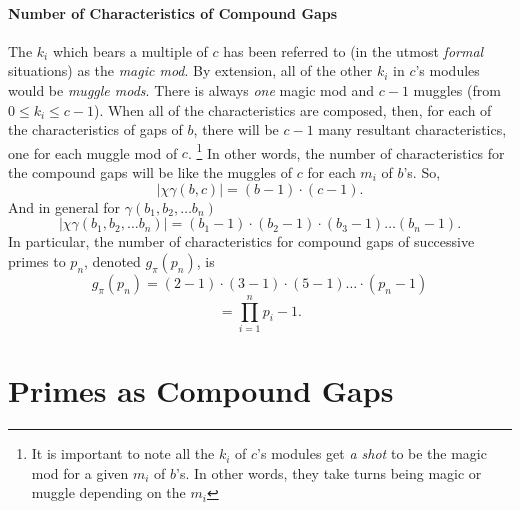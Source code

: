 \documentclass{article}
\begin{document}
\paragraph{Number of Characteristics of Compound Gaps}	The $k_i$ which bears a multiple of $c$ has been referred to (in the utmost \emph{formal} situations) as the \emph{magic mod}. By extension, all of the other $k_i$ in $c$'s modules would be \emph{muggle mods}. There is always \emph{one} magic mod and $c-1$ muggles (from $0 \leq k_i \leq c-1$). When all of the characteristics are composed, then, for each of the characteristics of gaps of $b$, there will be $c-1$ many resultant characteristics, one for each muggle mod of $c$. \footnote{It is important to note all the $k_i$ of $c$'s modules get \emph{a shot} to be the magic mod for a given $m_i$ of $b$'s. In other words, they take turns being magic or muggle depending on the $m_i$} In other words, the number of characteristics for the compound gaps will be like the muggles of $c$ for each $m_i$ of $b$'s. So,
	\begin{equation*}\lvert \chi \gamma(b,c) \rvert = (b-1) \cdot (c-1).\end{equation*}	
And in general for $\gamma(b_1, b_2, \ldots b_n)$
	\begin{equation*}\lvert \chi \gamma(b_1, b_2, \dots b_n) \rvert = (b_1-1) \cdot (b_2-1) \cdot (b_3-1) \ldots (b_n-1).\end{equation*}
In particular, the number of characteristics for compound gaps of successive primes to $p_n$, denoted $g_\pi(p_n)$, is
	\begin{equation*}g_{\pi}(p_n) = (2-1) \cdot (3-1) \cdot (5-1) \ldots \cdot (p_{n}-1)  \end{equation*}
	\begin{equation*} = \prod_{i=1}^{n} p_{i} -1.\end{equation*}

\section{Primes as Compound Gaps}
\end{document}
